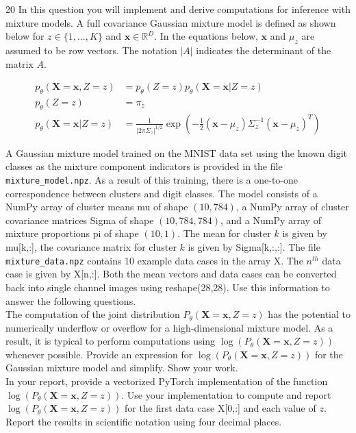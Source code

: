 \documentclass[11pt]{article}
\newcommand{\mbf}[1]{{\mathbf{#1}}}
\begin{document}
\begin{problem}{20} In this question you will implement and derive computations for inference with mixture models. A full covariance Gaussian mixture model is defined as shown below for $z\in\{1,...,K\}$ and $\mbf{x}\in \mathbb{R}^D$. In the equations below, $\mbf{x}$ and $\mu_z$ are assumed to be row vectors. The notation $|A|$ indicates the determinant of the matrix $A$.

\begin{align*}
    p_{\theta}(\mbf{X}=\mbf{x},Z=z) &= p_{\theta}(Z=z)p_{\theta}(\mbf{X}=\mbf{x}|Z=z)\\
    p_{\theta}(Z=z)&=\pi_z \\
    p_{\theta}(\mbf{X}=\mbf{x}|Z=z) &= \frac{1}{|2\pi\Sigma_z|^{1/2}}\exp\left(-\frac{1}{2}(\mbf{x}-\mu_z)\Sigma_z^{-1}(\mbf{x}-\mu_z)^T\right)
\end{align*}

A Gaussian mixture model trained on the MNIST data set using the known digit classes as the mixture component indicators is provided in the file \verb|mixture_model.npz|. As a result of this training, there is a one-to-one correspondence between clusters and digit classes. The model consists of a NumPy array of cluster means mu of shape $(10,784)$, a NumPy array of cluster covariance matrices Sigma of shape $(10,784,784)$, and a NumPy array of mixture proportions pi of shape $(10,1)$. The mean for cluster $k$ is given by mu[k,:], the covariance matrix for cluster $k$ is given by Sigma[k,:,:]. The file \verb|mixture_data.npz| contains 10 example data cases in the array X. The $n^{th}$ data case is given by X[n,:]. Both the mean vectors and data cases can be converted back into single channel images using reshape(28,28). Use this information to answer the following questions.\\

 The computation of the joint distribution $P_{\theta}(\mbf{X}=\mbf{x},Z=z)$ has the potential to numerically underflow or overflow for a high-dimensional mixture model. As a result, it is typical to perform computations using  $\log (P_{\theta}(\mbf{X}=\mbf{x},Z=z))$ whenever possible. Provide an expression for $\log (P_{\theta}(\mbf{X}=\mbf{x},Z=z))$ for the Gaussian mixture model and simplify. Show your work.\\

 In your report, provide a vectorized PyTorch implementation of the function $\log(P_{\theta}(\mbf{X}=\mbf{x},Z=z))$. Use your implementation to compute and report $\log(P_{\theta}(\mbf{X}=\mbf{x},Z=z))$ for the first data case X[0,:] and each value of $z$. Report the results in scientific notation using four decimal places.\\


\end{problem}
\end{document}
